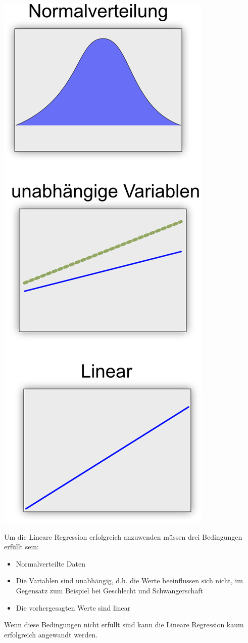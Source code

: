 \documentclass[
  12pt, %
  a4paper, %
  oneside, %
  openany, 
  numbers=noenddot, %
  BCOR=5mm, %
  parskip=half*, %
  thesis, %
]{bfhbook}
\begin{document}
\begin{center}
\begin{minipage}[t]{0.45\linewidth}
\vspace{0pt}
\includegraphics[width=0.6\linewidth]{Bilder/Regressions-Bedingungen.png}
\end{minipage}\hfill
\begin{minipage}[t]{0.45\linewidth}
\vspace{0pt}
Um die Lineare Regression erfolgreich anzuwenden müssen drei Bedingungen erfüllt sein:
\begin{itemize}
	\item Normalverteilte Daten
	\item Die Variablen sind unabhängig, d.h. die Werte beeinflussen sich nicht, im Gegensatz zum Beispiel bei Geschlecht und Schwangerschaft
	\item Die vorhergesagten Werte sind linear
\end{itemize}
Wenn diese Bedingungen nicht erfüllt sind kann die Lineare Regression kaum erfolgreich angewandt werden.
\end{minipage}
\end{center}
\end{document}
